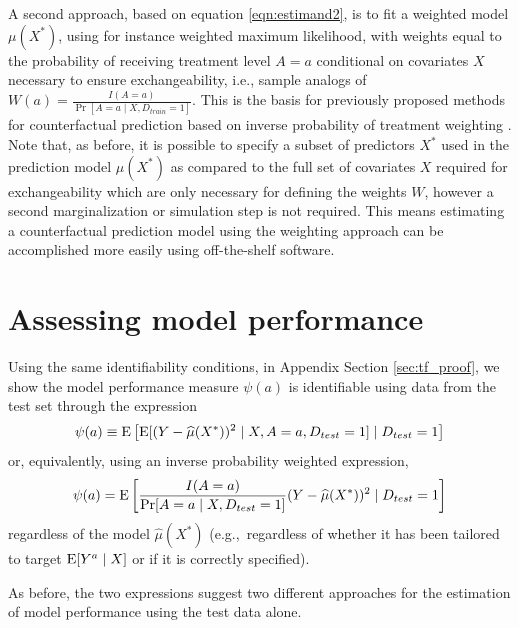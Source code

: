 A second approach, based on equation \ref{eqn:estimand2}, is to fit a weighted model $\mu(X^*)$, using for instance weighted maximum likelihood, with weights equal to the probability of receiving treatment level $A = a$ conditional on covariates $X$ necessary to ensure exchangeability, i.e., sample analogs of $W(a) = \frac{I(A = a)}{\Pr[A = a \mid X, D_{train} = 1]}$. This is the basis for previously proposed methods for counterfactual prediction based on inverse probability of treatment weighting \cite{sperrin_using_2018, van_geloven_prediction_2020}. Note that, as before, it is possible to specify a subset of predictors $X^*$ used in the prediction model $\mu(X^*)$ as compared to the full set of covariates $X$ required for exchangeability which are only necessary for defining the weights $W$, however a second marginalization or simulation step is not required. This means estimating a counterfactual prediction model using the weighting approach can be accomplished more easily using off-the-shelf software.


\section{Assessing model performance} \label{sec:performance}

Using the same identifiability conditions, in Appendix Section \ref{sec:tf_proof}, we show the model performance measure $\psi(a)$ is identifiable using data from the test set through the expression
\begin{equation}\label{eqn:mse1}
    \psi(a) \equiv \operatorname{E}\left[\operatorname{E}[(Y - \widehat{\mu}(X^*))^2 \mid X, A=a, D_{test} = 1] \mid D_{test} = 1\right]
\end{equation}
or, equivalently, using an inverse probability weighted expression, 
\begin{equation}\label{eqn:mse2}
    \psi(a) = \operatorname{E}\left[\frac{I(A = a)}{\Pr[A = a \mid X, D_{test} = 1]}(Y - \widehat{\mu}(X^*))^2 \mid D_{test} = 1\right]
\end{equation}
regardless of the model $\widehat{\mu}(X^*)$ (e.g.,~regardless of whether it has been tailored to target $\operatorname{E}[Y^a \mid X]$ or if it is correctly specified). 

As before, the two expressions suggest two different approaches for the estimation of model performance using the test data alone. 

